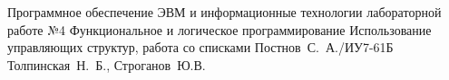 \documentclass{bmstu}
\begin{document}
	
	{Программное обеспечение ЭВМ и информационные технологии}
	{лабораторной работе №4}
	{Функциональное и логическое программирование}
	{Использование управляющих структур, работа со списками}
	{}
	{Постнов~С.~А./ИУ7-61Б}
	{Толпинская~Н.~Б., Строганов~Ю.В.}
	
	\maketableofcontents
	
	
	
\end{document}
